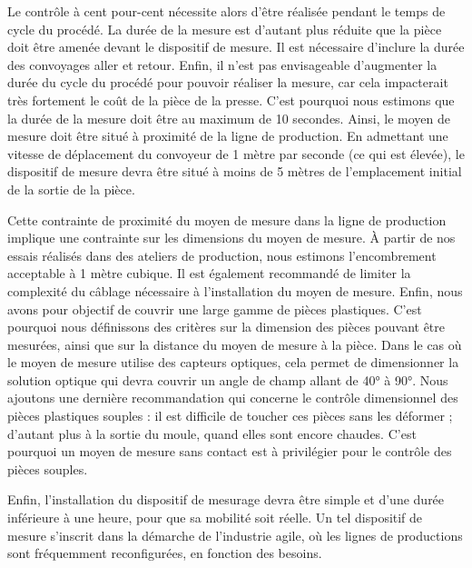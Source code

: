 Le contrôle à cent pour-cent nécessite alors d'être réalisée pendant le temps de cycle du procédé.
La durée de la mesure est d'autant plus réduite que la pièce doit être amenée devant le dispositif de mesure.
Il est nécessaire d'inclure la durée des convoyages aller et retour.
Enfin, il n'est pas envisageable d'augmenter la durée du cycle du procédé pour pouvoir réaliser la mesure, car cela impacterait très fortement le coût de la pièce de la presse.
C'est pourquoi nous estimons que la durée de la mesure doit être au maximum de 10 secondes.
%
Ainsi, le moyen de mesure doit être situé à proximité de la ligne de production.
En admettant une vitesse de déplacement du convoyeur de 1 mètre par seconde (ce qui est élevée), le dispositif de mesure devra être situé à moins de 5 mètres de l'emplacement initial de la sortie de la pièce.
%

Cette contrainte de proximité du moyen de mesure dans la ligne de production implique une contrainte sur les dimensions du moyen de mesure.
À partir de nos essais réalisés dans des ateliers de production, nous estimons l'encombrement acceptable à 1 mètre cubique.
Il est également recommandé de limiter la complexité du câblage nécessaire à l'installation du moyen de mesure.
%
Enfin, nous avons pour objectif de couvrir une large gamme de pièces plastiques.
C'est pourquoi nous définissons des critères sur la dimension des pièces pouvant être mesurées, ainsi que sur la distance du moyen de mesure à la pièce.
Dans le cas où le moyen de mesure utilise des capteurs optiques, cela permet de dimensionner la solution optique qui devra couvrir un angle de champ allant de 40° à 90°.
%
Nous ajoutons une dernière recommandation qui concerne le contrôle dimensionnel des pièces plastiques souples : il est difficile de toucher ces pièces sans les déformer ; d'autant plus à la sortie du moule, quand elles sont encore chaudes.
C'est pourquoi un moyen de mesure sans contact est à privilégier pour le contrôle des pièces souples.

Enfin, l'installation du dispositif de mesurage devra être simple et d'une durée inférieure à une heure, pour que sa mobilité soit réelle.
Un tel dispositif de mesure s'inscrit dans la démarche de l'industrie agile, où les lignes de productions sont fréquemment reconfigurées, en fonction des besoins.

